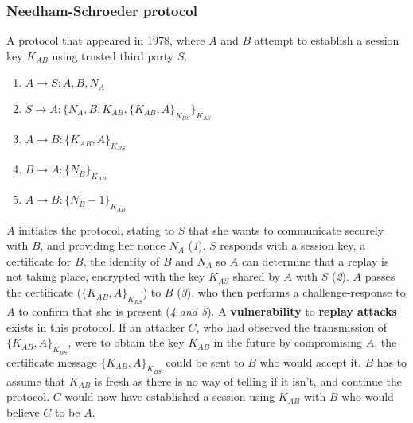 \documentclass{article}
\begin{document}
\subsubsection{Needham-Schroeder protocol}
A protocol that appeared in 1978, where $ A $ and $ B $ attempt to establish a session key $ K_{AB} $ using trusted third party $ S $.
\begin{enumerate}
	\item $ A \rightarrow S : A, B, N_{A} $
	\item $ S \rightarrow A : \{ N_{A}, B, K_{AB}, \{ K_{AB}, A \}_{K_{BS}} \}_{K_{AS}} $
	\item $ A \rightarrow B : \{ K_{AB}, A \}_{K_{BS}} $
	\item $ B \rightarrow A : \{ N_{B} \}_{K_{AB}}  $
	\item $ A \rightarrow B : \{ N_{B} - 1 \}_{K_{AB}} $
\end{enumerate}
$ A $ initiates the protocol, stating to $ S $ that she wants to communicate securely with $ B $, and providing her nonce $ N_{A} $ (\textit{1}). $ S $ responds with a session key, a certificate for $ B $, the identity of $ B $ and $ N_{A} $ so $ A $ can determine that a replay is not taking place, encrypted with the key $ K_{AS} $ shared by $ A $ with $ S $ (\textit{2}). $ A $ passes the certificate ($ \{ K_{AB}, A \}_{K_{BS}} $) to $ B $ (\textit{3}), who then performs a challenge-response to $ A $ to confirm that she is present (\textit{4 and 5}). A \textbf{vulnerability} to \textbf{replay attacks} exists in this protocol. If an attacker $ C $, who had observed the transmission of $ \{ K_{AB}, A \}_{K_{BS}} $, were to obtain the key $ K_{AB} $ in the future by compromising $ A $, the certificate message $ \{ K_{AB}, A \}_{K_{BS}} $ could be sent to $ B $ who would accept it. $ B $ has to assume that $ K_{AB} $ is fresh as there is no way of telling if it isn't, and continue the protocol. $ C $ would now have established a session using $ K_{AB} $ with $ B $ who would believe $ C $ to be $ A $.
\end{document}
